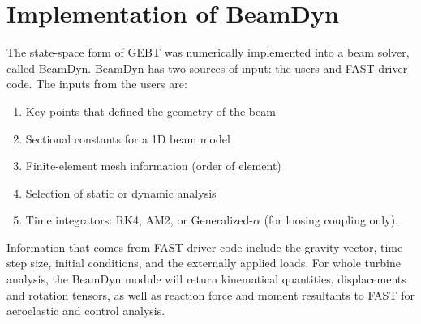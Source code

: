 \documentclass{aiaa-tc}
\begin{document}
\section{Implementation of BeamDyn}
The state-space form of GEBT was numerically implemented into a beam solver, called BeamDyn. BeamDyn has two sources of input:  the users and FAST driver code. The inputs from the users are:
\begin{enumerate}
    \item Key points that defined the geometry of the beam
    \item Sectional constants for a 1D beam model
    \item Finite-element mesh information (order of element)
    \item Selection of static or dynamic analysis
    \item Time integrators: RK4, AM2, or Generalized-$\alpha$ (for loosing coupling only).
\end{enumerate}
Information that comes from FAST driver code include the gravity vector, time step size, initial conditions, and the externally applied loads.  For whole turbine analysis, the BeamDyn module will return kinematical quantities, displacements and rotation tensors, as well as reaction force and moment resultants to FAST for aeroelastic and control analysis.
\end{document}
